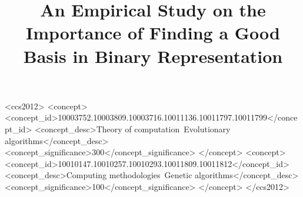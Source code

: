 \documentclass[sigconf,natbib=false]{acmart}
\newcommand{\1}{\mathbf{1}}
\begin{document}
\title{An Empirical Study on the Importance of Finding a Good Basis in Binary Representation}


%
%
%
%
%
%



\begin{abstract}
    
\end{abstract}

%
%
\begin{CCSXML}
<ccs2012>
    <concept>
        <concept_id>10003752.10003809.10003716.10011136.10011797.10011799</concept_id>
        <concept_desc>Theory of computation~Evolutionary algorithms</concept_desc>
        <concept_significance>300</concept_significance>
    </concept>
     <concept>
        <concept_id>10010147.10010257.10010293.10011809.10011812</concept_id>
        <concept_desc>Computing methodologies~Genetic algorithms</concept_desc>
        <concept_significance>100</concept_significance>
    </concept>
</ccs2012>
\end{CCSXML}
\end{document}
